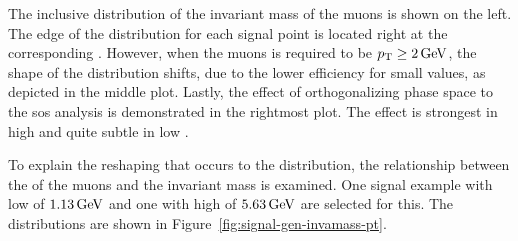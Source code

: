 The inclusive distribution of the invariant mass of the muons \mmumu is shown on the left. The edge of the \mmumu distribution for each signal point is located right at the corresponding \dm. However, when the muons \pt is required to be $p_{\mathrm{T}}\geq 2\,\text{Ge\hspace{-.08em}V}$, the shape of the distribution shifts, due to the lower efficiency for small \dm values, as depicted in the middle plot. Lastly, the effect of orthogonalizing phase space to the \gls{sos} analysis is demonstrated in the rightmost plot. The effect is strongest in high \dm and quite subtle in low \dm.

To explain the reshaping that occurs to the \mmumu distribution, the relationship between the \pt of the muons and the invariant mass is examined. One signal example with low \dm of $1.13\,\text{Ge\hspace{-.08em}V}$ and one with high \dm of $5.63\,\text{Ge\hspace{-.08em}V}$ are selected for this. The distributions are shown in Figure~\ref{fig:signal-gen-invamass-pt}.

